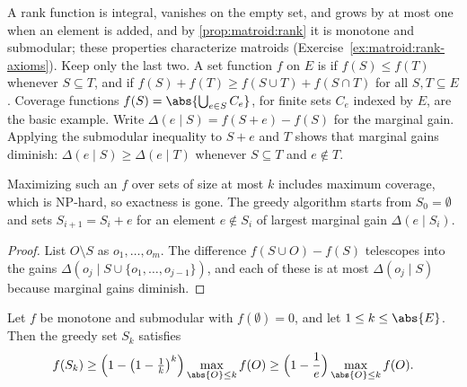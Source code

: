 \begin{refsection}
A rank function is integral, vanishes on the empty set, and grows by at most one when an element is added, and by \cref{prop:matroid:rank} it is monotone and submodular; these properties characterize matroids (Exercise~\ref{ex:matroid:rank-axioms}). Keep only the last two. A set function $f$ on $E$ is  if $f(S)\le f(T)$ whenever $S\subseteq T$, and  if $f(S)+f(T)\ge f(S\cup T)+f(S\cap T)$ for all $S,T\subseteq E$. Coverage functions $f(S)=\abs{\bigcup_{e\in S}C_e}$, for finite sets $C_e$ indexed by $E$, are the basic example. Write $\Delta(e\mid S)=f(S+e)-f(S)$ for the marginal gain. Applying the submodular inequality to $S+e$ and $T$ shows that marginal gains diminish: $\Delta(e\mid S)\ge\Delta(e\mid T)$ whenever $S\subseteq T$ and $e\notin T$.

Maximizing such an $f$ over sets of size at most $k$ includes maximum coverage, which is NP-hard, so exactness is gone. The greedy algorithm starts from $S_0=\emptyset$ and sets $S_{i+1}=S_i+e$ for an element $e\notin S_i$ of largest marginal gain $\Delta(e\mid S_i)$.


\begin{proof}
List $O\setminus S$ as $o_1,\dots,o_m$. The difference $f(S\cup O)-f(S)$ telescopes into the gains $\Delta(o_j\mid S\cup\{o_1,\dots,o_{j-1}\})$, and each of these is at most $\Delta(o_j\mid S)$ because marginal gains diminish.
\end{proof}

\begin{theorem}\label{thm:matroid:nwf}
Let $f$ be monotone and submodular with $f(\emptyset)=0$, and let $1\le k\le\abs{E}$. Then the greedy set $S_k$ satisfies
\[
f(S_k)\ge\Bigl(1-\bigl(1-\tfrac1k\bigr)^k\Bigr)\max_{\abs{O}\le k}f(O)\ge\Bigl(1-\frac1e\Bigr)\max_{\abs{O}\le k}f(O).
\]
\end{theorem}


\end{refsection}
